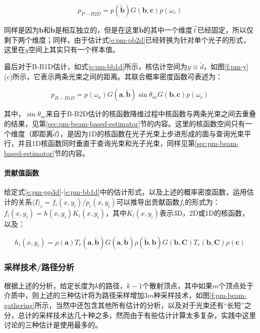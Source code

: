 \begin{equation}
	p_{P-B2D}=p(\tilde{\mathbf{b}})G(\mathbf{b},\mathbf{c})p(\omega_c)
\end{equation}

同样是因为$\mathbf{b}$和$\tilde{\mathbf{b}}$是相互独立的，但是在这里$\tilde{\mathbf{b}}$的其中一个维度$\vec{t}$已经固定，所以仅剩下两个维度；同样，由于估计式\ref{e:pm-pb2d}已经转换为针对单个光子的形式，这里在$y$空间上其实只有一个样本值。

最后对于B-B1D估计，如式\ref{e:pm-bb1d}所示，核估计空间为$y\equiv \tilde{d}$，如图\ref{f:pm-y}(c)所示，它表示两条光束之间的距离。其联合概率密度函数可表述为：

\begin{equation}
	p_{B-B1D}=p(\omega_a)G(\mathbf{a},\tilde{\mathbf{b}})\sin \theta_{ac}G(\mathbf{b},\mathbf{c})p(\omega_c)
\end{equation}

其中，$\sin\theta_{ac}$来自于B-B2D估计的核函数降维过程中核函数与两条光束之间去重叠的结果，见第\ref{sec:pm-beam-based-estimator}节的内容。这里的核函数空间只有一个维度（即距离$\tilde{d}$），是因为1D的核函数在光子光束上步进形成的面与查询光束平行，并且1D核函数同时垂直于查询光束和光子光束，同样见第\ref{sec:pm-beam-based-estimator}节的内容。




\paragraph{贡献值函数}
给定式\ref{e:pm-pp3d}-\ref{e:pm-bb1d}中的估计形式，以及上述的概率密度函数，运用估计的关系$\langle I\rangle_i=f_i(x,y_i)/p_i(x,y_i)$可以推导出贡献函数$f_i$的形式为：$f_i(x,y_i)=h(x,y_i)K_i(x,y_i)$，其中$K_i(x,y_i)$表示3D，2D或1D的核函数，以及：

\begin{equation}
	h_i(x,y_i)=\rho(\mathbf{a})T_r(\mathbf{a},\tilde{\mathbf{b}})G(\mathbf{a},\tilde{\mathbf{b}})\rho(\tilde{\mathbf{b}},\mathbf{b})G(\mathbf{b},\mathbf{C})T_r(\mathbf{b},\mathbf{C})\rho(\mathbf{c})
\end{equation}





\subsubsection{采样技术/路径分析}
根据上述的分析，给定长度为$k$的路径，$k-1$个散射顶点，其中如果$m$个顶点处于介质中，则上述的三种估计将为路径采样增加3$m$种采样技术，如图\ref{f:pm-beam-gathering}所示，当然\cite{a:UnifyingPointsBeamsandPathsinVolumetricLightTransportSimulation}中还包含其他所有估计的分析，以及对于光束还有“长短”之分，总计的采样技术达几十种之多，然而由于有些估计计算太多复杂，实践中这里讨论的三种估计是使用最多的。


